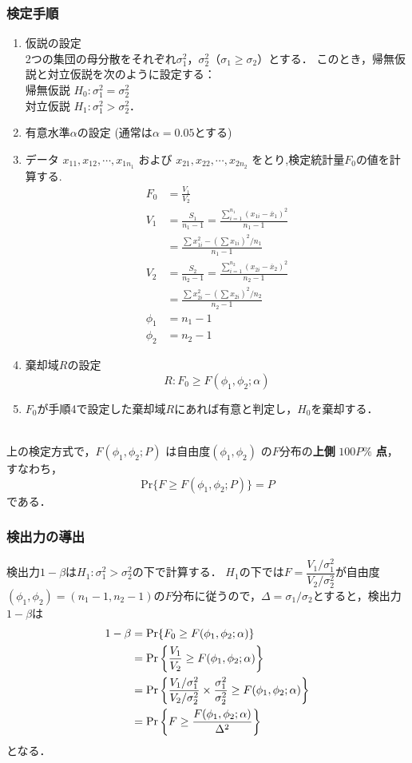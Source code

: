\documentclass{jsarticle}
\begin{document}
\subsubsection{検定手順}
\begin{enumerate}[label=手順\arabic*]
\item 仮説の設定\\
2つの集団の母分散をそれぞれ$\sigma_1^2$，$\sigma_2^2$（$\sigma_1\geq \sigma_2$）とする．
このとき，帰無仮説と対立仮説を次のように設定する：\\
帰無仮説 $ H_0 : \sigma_1^2 = \sigma_2^2 $ \\
対立仮説 $ H_1 : \sigma_1^2 > \sigma_2^2 $．
\item 有意水準$\alpha$の設定 (通常は$\alpha =0.05$とする)
\item データ $ x_{11}, x_{12}, \dotsb, x_{1n_1} $ および $ x_{21}, x_{22}, \dotsb, x_{2n_2} $ をとり,検定統計量$F_0$の値を計算する.
\begin{align*}
F_0 &=\frac{V_1}{V_2} \\
V_1 &=\frac{S_1}{n_1-1} = \frac{\sum_{i=1}^{n_1} (x_{1i}-\overline{x}_1)^2}{n_1-1} \\
&=\frac{\sum x_{1i}^{2} - (\sum x_{1i})^2/n_1}{n_1-1} \\
V_2 &=\frac{S_2}{n_2-1} = \frac{\sum_{i=1}^{n_2} (x_{2i}-\overline{x}_2)^2}{n_2-1} \\
&=\frac{\sum x_{2i}^{2} - (\sum x_{2i})^2/n_2}{n_2-1} \\
\phi_1 &=n_1-1 \\
\phi_2 &=n_2-1
\end{align*}
\item 棄却域$R$の設定
\[ R : F_0\geq F(\phi_1, \phi_2; \alpha) \]
\item $F_0$が手順4で設定した棄却域$R$にあれば有意と判定し，$H_0$を棄却する．
\end{enumerate}
\ \\
上の検定方式で，$F(\phi_1, \phi_2; P)$ は自由度$(\phi_1, \phi_2)$ の$F$分布の\textbf{上側} $100P\%$ \textbf{点}，すなわち，
\begin{equation}
\mathrm{Pr}\{ F\geq F(\phi_1, \phi_2; P)\} =P \label{1}
\end{equation}
である．

\subsubsection{検出力の導出}
検出力$1-\beta$は$H_1 : \sigma_1^2>\sigma_2^2$の下で計算する．
$H_1$の下では$F=\dfrac{V_1/\sigma_1^2}{V_2/\sigma_2^2}$が自由度
$(\phi_1, \phi_2)=(n_1-1, n_2-1)$の$F$分布に従うので，$\Delta=\sigma_1/\sigma_2$とすると，検出力$1-\beta$は
\begin{align}
1-\beta &=\mathrm{Pr}\{F_0\geq F(\phi_1, \phi_2; \alpha)\} \notag \\
&=\mathrm{Pr}\left\{ \frac{V_1}{V_2}\geq F(\phi_1, \phi_2; \alpha)\right\} \notag \\
&=\mathrm{Pr}\left\{ \frac{V_1/\sigma_1^2}{V_2/\sigma_2^2}\times \frac{\sigma_1^2}{\sigma_2^2}\geq F(\phi_1, \phi_2; \alpha)\right\} \notag \\
&=\mathrm{Pr}\left\{ F\geq \frac{F(\phi_1, \phi_2; \alpha)}{\Delta^2}\right\} \label{2}
\end{align}
となる．
\end{document}
